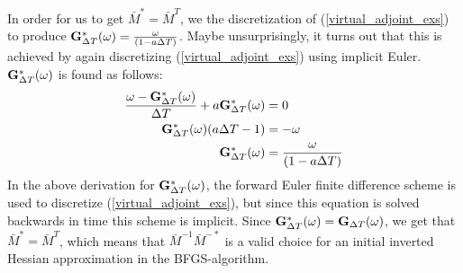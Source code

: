 In order for us to get $\bar{M}^*=\bar{M}^T$, we the discretization of (\ref{virtual_adjoint_exs}) to produce $\bold{G}_{\Delta T}^*(\omega)=\frac{\omega}{(1-a\Delta T)}$. Maybe unsurprisingly, it turns out that this is achieved by again discretizing (\ref{virtual_adjoint_exs}) using implicit Euler. $\bold{G}_{\Delta T}^*(\omega)$ is found as follows:
\begin{align*}
\frac{\omega-\bold{G}_{\Delta T}^*(\omega)}{\Delta T} + a \bold{G}_{\Delta T}^*(\omega)&=0 \\
\bold{G}_{\Delta T}^*(\omega)(a\Delta T-1)&=-\omega \\
\bold{G}_{\Delta T}^*(\omega)&=\frac{\omega}{(1-a\Delta T)}
\end{align*}
In the above derivation for $\bold{G}_{\Delta T}^*(\omega)$, the forward Euler finite difference scheme is used to discretize (\ref{virtual_adjoint_exs}), but since this equation is solved backwards in time this scheme is implicit. Since $\bold{G}_{\Delta T}^*(\omega)=\bold{G}_{\Delta T}(\omega)$, we get that $\bar{M}^*=\bar{M}^T$, which means that $\bar{M}^{-1}\bar{M}^{-*}$ is a valid choice for an initial inverted Hessian approximation in the BFGS-algorithm.
